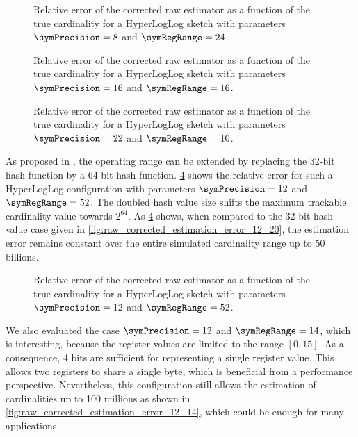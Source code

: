 \documentclass[a4paper]{scrartcl}
\begin{document}
\begin{figure}
\centering

\caption{Relative error of the corrected raw estimator as a function of the true cardinality for a HyperLogLog sketch with parameters $\symPrecision = 8$ and $\symRegRange=24$.}
\label{fig:raw_corrected_estimation_error_8_24}
\end{figure}

\begin{figure}
\centering

\caption{Relative error of the corrected raw estimator as a function of the true cardinality for a HyperLogLog sketch with parameters $\symPrecision = 16$ and $\symRegRange=16$.}
\label{fig:raw_corrected_estimation_error_16_16}
\end{figure}

\begin{figure}
\centering

\caption{Relative error of the corrected raw estimator as a function of the true cardinality for a HyperLogLog sketch with parameters $\symPrecision = 22$ and $\symRegRange=10$.}
\label{fig:raw_corrected_estimation_error_22_10}
\end{figure}

As proposed in \cite{Heule2013}, the operating range can be extended by
replacing the 32-bit hash function by a 64-bit hash function. \cref{fig:raw_corrected_estimation_error_12_52} shows the relative error for such a HyperLogLog configuration with parameters $\symPrecision=12$ and $\symRegRange=52$. The doubled hash value size shifts the maximum trackable cardinality value towards $2^{64}$. As \cref{fig:raw_corrected_estimation_error_12_52} shows, when compared to the 32-bit hash value case given in \cref{fig:raw_corrected_estimation_error_12_20}, the estimation error remains constant over the entire simulated cardinality range up to 50 billions.

\begin{figure}
\centering

\caption{Relative error of the corrected raw estimator as a function of the true cardinality for a HyperLogLog sketch with parameters $\symPrecision = 12$ and $\symRegRange=52$.}
\label{fig:raw_corrected_estimation_error_12_52}
\end{figure}

We also evaluated the case $\symPrecision = 12$ and $\symRegRange=14$, which is interesting, because the register values are limited to the range $[0, 15]$. As a consequence, 4 bits are sufficient for representing a single register value. This allows two registers to share a single byte, which is beneficial from a performance perspective. Nevertheless, this configuration still allows the estimation of cardinalities up to 100 millions as shown in \cref{fig:raw_corrected_estimation_error_12_14}, which could be enough for many applications.
\end{document}
